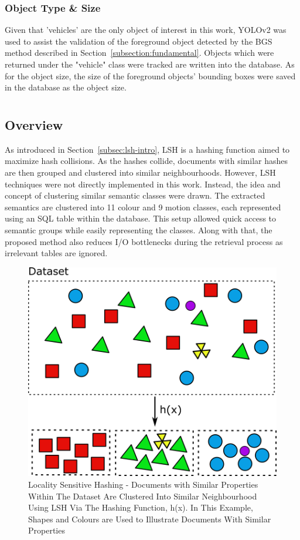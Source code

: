 \subsubsection{Object Type \& Size}
\label{objecttype}
Given that 'vehicles' are the only object of interest in this work, YOLOv2 was used to assist the validation of the foreground object detected by the BGS method described in Section~\ref{subsection:fundamental}. Objects which were returned under the "vehicle" class were tracked are written into the database. As for the object size, the size of the foreground objects' bounding boxes were saved in the database as the object size.


\section{\versionOneExt }
\label{section:semantic_lsh}

\subsection{Overview}
As introduced in Section~\ref{subsec:lsh-intro}, LSH is a hashing function aimed to maximize hash collisions.
As the hashes collide, documents with similar hashes are then grouped and clustered into similar neighbourhoods.
However, LSH techniques were not directly implemented in this work. Instead, the idea and concept of clustering similar semantic classes were drawn.
The extracted semantics are clustered into 11 colour and 9 motion classes, each represented using an SQL table within the database.
This setup allowed quick access to semantic groups while easily representing the classes. Along with that, the proposed method also reduces I/O bottlenecks during the retrieval process as irrelevant tables are ignored.


\begin{figure}[hbt!]\centering
\includegraphics[width=.7\textwidth]{image/new/lsh.png}
\caption{Locality Sensitive Hashing - Documents with Similar Properties Within The Dataset Are Clustered Into Similar Neighbourhood Using LSH Via The Hashing Function, h(x). In This Example, Shapes and Colours are Used to Illustrate Documents With Similar Properties}
\label{fig:lshexample}
\end{figure}

